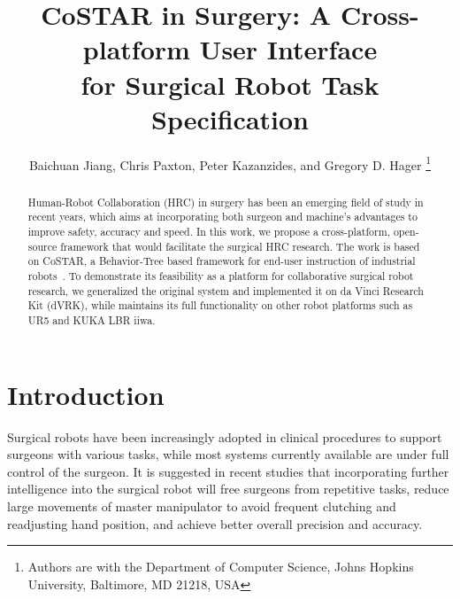 \documentclass[letterpaper, 10 pt, conference]{ieeeconf}
\title{\huge \bf
CoSTAR in Surgery: A Cross-platform User Interface \\for Surgical Robot Task Specification
}
\author{Baichuan Jiang, Chris Paxton, Peter Kazanzides, and Gregory D. Hager
\thanks{Authors are with the Department of Computer Science, Johns Hopkins University,
        Baltimore, MD 21218, USA}
}
\begin{document}
\maketitle
\thispagestyle{empty}
\pagestyle{empty}


\newcommand{\fix}[1]{{\color{red} \textbf{[FIX: #1]}}}
\newcommand{\todo}[2]{{\color{blue} \textbf{[TODO(#1): #2]}}}

\begin{abstract}

Human-Robot Collaboration (HRC) in surgery has been an emerging field of study in recent years, which aims at incorporating both surgeon and machine's advantages to improve safety, accuracy and speed. In this work, we propose a cross-platform, open-source framework that would facilitate the surgical HRC research. The work is based on CoSTAR, a Behavior-Tree based framework for end-user instruction of industrial robots~\cite{paxton2017costar}. To demonstrate its feasibility as a platform for collaborative surgical robot research, we generalized the original system and implemented it on da Vinci Research Kit (dVRK), while maintains its full functionality on other robot platforms such as UR5 and KUKA LBR iiwa.  

\end{abstract}


\section{Introduction}

Surgical robots have been increasingly adopted in clinical procedures to support surgeons with various tasks, while most systems currently available are under full control of the surgeon. It is suggested in recent studies \cite{padoy2011human,berthet2016hubot,bauzano2016collaborative,hu2015semi} that incorporating further intelligence into the surgical robot will free surgeons from repetitive tasks, reduce large movements of master manipulator to avoid frequent clutching and readjusting hand position, and achieve better overall precision and accuracy. 
\end{document}
